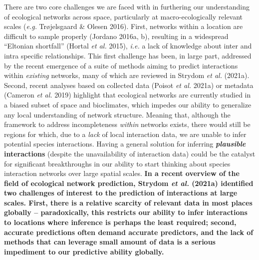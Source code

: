 \documentclass[11pt]{article}
\makeatletter
\def\maxwidth{\ifdim\Gin@nat@width>\linewidth\linewidth
\else\Gin@nat@width\fi}
\let\Oldincludegraphics\includegraphics
\renewcommand{\includegraphics}[1]{\Oldincludegraphics[width=\maxwidth]{#1}}
\providecommand{\DIFaddtex}[1]{{\bf #1}} %
\providecommand{\DIFdeltex}[1]{} %
\providecommand{\DIFaddbegin}{\protect\color{blue}} %
\providecommand{\DIFaddend}{\protect\color{black}} %
\providecommand{\DIFdelbegin}{\protect\color{red}} %
\providecommand{\DIFdelend}{\protect\color{black}} %
\providecommand{\DIFadd}[1]{\texorpdfstring{\DIFaddtex{#1}}{#1}} %
\providecommand{\DIFdel}[1]{\texorpdfstring{\DIFdeltex{#1}}{}} %
\newcommand{\DIFscaledelfig}{0.5}
\newlength{\DIFdelgraphicswidth} %
\newlength{\DIFdelgraphicsheight} %
\newcommand{\DIFaddincludegraphics}[2][]{{\color{blue}\fbox{\DIFOincludegraphics[#1]{#2}}}} %
\newcommand{\DIFdelincludegraphics}[2][]{%
\sbox{\DIFdelgraphicsbox}{\DIFOincludegraphics[#1]{#2}}%
\settoboxwidth{\DIFdelgraphicswidth}{\DIFdelgraphicsbox} %
\settoboxtotalheight{\DIFdelgraphicsheight}{\DIFdelgraphicsbox} %
\scalebox{\DIFscaledelfig}{%
\parbox[b]{\DIFdelgraphicswidth}{\usebox{\DIFdelgraphicsbox}\\[-\baselineskip] \rule{\DIFdelgraphicswidth}{0em}}\llap{\resizebox{\DIFdelgraphicswidth}{\DIFdelgraphicsheight}{%
\setlength{\unitlength}{\DIFdelgraphicswidth}%
\begin{picture}(1,1)%
\thicklines\linethickness{2pt} %
{\color[rgb]{1,0,0}\put(0,0){\framebox(1,1){}}}%
{\color[rgb]{1,0,0}\put(0,0){\line( 1,1){1}}}%
{\color[rgb]{1,0,0}\put(0,1){\line(1,-1){1}}}%
\end{picture}%
}\hspace*{3pt}}} %
} %
\DeclareRobustCommand{\DIFaddbegin}{\DIFOaddbegin \let\includegraphics\DIFaddincludegraphics} %
\DeclareRobustCommand{\DIFaddend}{\DIFOaddend \let\includegraphics\DIFOincludegraphics} %
\DeclareRobustCommand{\DIFdelbegin}{\DIFOdelbegin \let\includegraphics\DIFdelincludegraphics} %
\DeclareRobustCommand{\DIFdelend}{\DIFOaddend \let\includegraphics\DIFOincludegraphics} %
\makeatother
\begin{document}
There are two core challenges we are faced with in furthering our
understanding of ecological networks across space, particularly at
macro-ecologically relevant scales (\emph{e.g.} Trøjelsgaard \& Olesen
2016). First, networks within a location are difficult to sample
properly (Jordano 2016a, b), resulting in a widespread ``Eltonian
shortfall'' (Hortal \emph{et al.} 2015), \emph{i.e.} a lack of knowledge
about inter and intra specific relationships. This first challenge has
been, in large part, addressed by the recent emergence of a suite of
methods aiming to predict interactions within \emph{existing} networks,
many of which are reviewed in Strydom \emph{et al.} (2021a). Second,
recent analyses based on collected data (Poisot \emph{et al.} 2021a) or
metadata (Cameron \emph{et al.} 2019) highlight that ecological networks
are currently studied in a biased subset of space and bioclimates, which
impedes our ability to generalize any local understanding of network
structure. Meaning that, although the framework to address
incompleteness \emph{within} networks exists, there would still be
regions for which, due to a \emph{lack} of local interaction data, we
are unable to infer potential species interactions. Having a general
solution for inferring \DIFdelbegin \DIFdel{a \emph{plausible} metaweb }\DIFdelend \DIFaddbegin \DIFadd{\emph{plausible} interactions }\DIFaddend (despite the
unavailability of interaction data) could be the catalyst for
significant breakthroughs in our ability to start thinking about species
interaction networks over large spatial scales. \DIFaddbegin \DIFadd{In a recent overview of
the field of ecological network prediction, Strydom \emph{et al.}
(2021a) identified two challenges of interest to the prediction of
interactions at large scales. First, there is a relative scarcity of
relevant data in most places globally -- paradoxically, this restricts
our ability to infer interactions to locations where inference is
perhaps the least required; second, accurate predictions often demand
accurate predictors, and the lack of methods that can leverage small
amount of data is a serious impediment to our predictive ability
globally.
}\DIFaddend 
\end{document}
